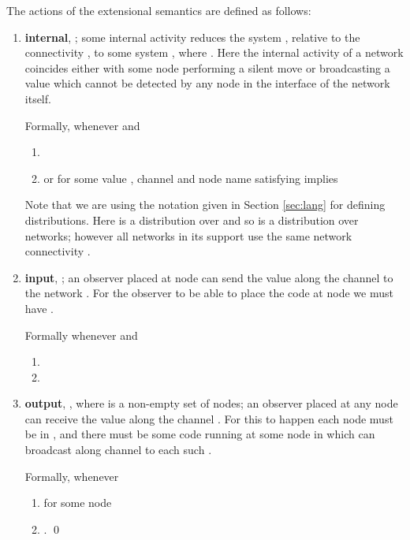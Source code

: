 \documentclass{LMCS}
\begin{document}
\begin{defi}\label{def:sea}   The actions of the extensional semantics are defined as follows:
\begin{enumerate}

\item \textbf{internal}, ; some internal activity reduces the system
, relative to the connectivity , to some system , where . Here the internal 
activity of a network coincides either with some node performing a silent move  or broadcasting a value 
which cannot be detected by any node in the interface of the network itself. 

Formally,  whenever  and 
\begin{enumerate}\item 
\item or  for some value , channel  and node name 
satisfying  implies 
 \end{enumerate}

\noindent Note that  we are using the notation given in Section \ref{sec:lang}
for defining distributions.  Here  is a distribution over
 and so  is a distribution over
networks; however all networks in its support use the same network connectivity
.

\item \textbf{input}, ; an observer
  placed at node  can send the value  along the channel  to the network
. For the observer to be able to place the code at node  we must have
. 

Formally  whenever 
 and 
 \begin{enumerate}\item 

 \item 
\end{enumerate}

\item \textbf{output}, , where  is a non-empty set of nodes; an observer
    placed at any node  can receive the value  along the
    channel .  For this to happen each node  must be in
    , and there must be some code running at
    some node in  which can broadcast along channel  to each
    such .

Formally,  whenever 

 \begin{enumerate}[label=(\roman*)]
 \item   for some node 
 \item  . \qed
 \end{enumerate}
\end{enumerate}
\end{defi}
\end{document}
